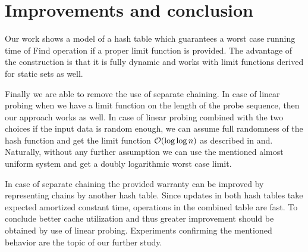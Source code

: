 \section{Improvements and conclusion}
\label{section-conclusion}
Our work shows a model of a hash table which guarantees a worst case running time of Find operation if a proper limit function is provided.
The advantage of the construction is that it is fully dynamic and works with limit functions derived for static sets as well.

Finally we are able to remove the use of separate chaining.
In case of linear probing when we have a limit function on the length of the probe sequence, then our approach works as well.
In case of linear probing combined with the two choices if the input data is random enough, we can assume full randomness of the hash function and get the limit function $\mathcal{O}(\log \log n)$ as described in\cite{DBLP:conf/soda/MitzenmacherV08} and\cite{Malalla:2004:THS:1124034}. 
Naturally, without any further assumption we can use the mentioned almost uniform system and get a doubly logarithmic worst case limit.

In case of separate chaining the provided warranty can be improved by representing chains by another hash table.
Since updates in both hash tables take expected amortized constant time, operations in the combined table are fast.
To conclude better cache utilization and thus greater improvement should be obtained by use of linear probing.
Experiments confirming the mentioned behavior are the topic of our further study.
